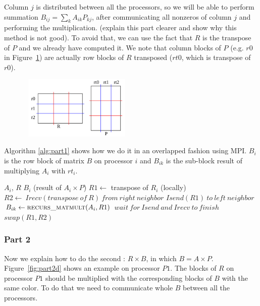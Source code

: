Column $j$ is distributed between all the processors, so we will be able to perform  summation $B_{ij} = \sum_{k} A_{ik} P_{kj}$, after communicating all nonzeros of column $j$ and performing the multiplication. (explain this part clearer and show why this method is not good). To avoid that, we can use the fact that $R$ is the transpose of $P$ and we already have computed it. We note that column blocks of $P$ (e.g. $r0$ in Figure~\ref{fig:part1c}) are actually row blocks of $R$ transposed ($rt0$, which is transpose of $r0$).

\begin{figure}[tbh]
 \centering
 \includegraphics[width=5.5cm,height=3cm]{./figures/part1c.pdf}
 \caption{}
 \label{fig:part1c}
\end{figure}

Algorithm \ref{alg:part1} shows how we do it in an overlapped fashion using MPI. $B_{i}$ is the row block of matrix $B$ on processor $i$ and $B_{ik}$ is the sub-block result of multiplying $A_i$ with $rt_i$.

\begin{algorithm}[H] 
  \caption{Part 1: $B_i = A_i \times P$} \label{alg:part1} 
  \begin{algorithmic}[1]
    \Require $A_i$, $R$
    \Ensure  $B_i$ (result of $A_i \times P$)
    \State $R1 \leftarrow$ transpose of $R_i$ (locally)
      \State $R2 \leftarrow\ Irecv(transpose\ of\ R)\ from\ right\ neighbor$
      \State $Isend(R1)\ to\ left\ neighbor$
      \State $B_{ik} \leftarrow \textsc{recurs\_matmult}(A_i, R1)$ 
      \State $wait\ for\ Isend\ and\ Irecv\ to\ finish$
      \State $swap(R1,R2)$
    \EndFor
  \end{algorithmic}
\end{algorithm}


\subsubsection{Part 2}

Now we explain how to do the second \mm: $R \times B$, in which $B = A \times P$. Figure~\ref{fig:part2d} shows an example on processor $P1$. The blocks of $R$ on processor $P1$ should be multiplied with the corresponding blocks of $B$ with the same color. To do that we need to communicate whole $B$ between all the processors.

